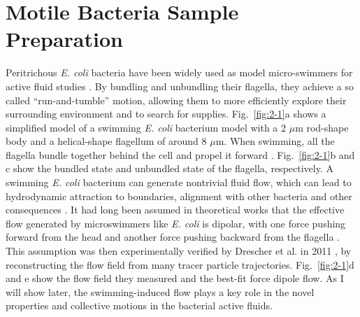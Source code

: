 \section{Motile Bacteria Sample Preparation}
\label{motile-bacteria-sample-preparation}
Peritrichous \textit{E. coli} bacteria have been widely used as model micro-swimmers for active fluid studies \cite{Poon2012, Schwarz-Linek2016}. By bundling and unbundling their flagella, they achieve a so called ``run-and-tumble'' motion, allowing them to more efficiently explore their surrounding environment and to search for supplies. Fig.~\ref{fig:2-1}a shows a simplified model of a swimming \textit{E. coli} bacterium model with a 2 $\mu$m rod-shape body and a helical-shape flagellum of around 8 $\mu$m. When swimming, all the flagella bundle together behind the cell and propel it forward \cite{Lauga2016}. Fig.~\ref{fig:2-1}b and c show the bundled state and unbundled state of the flagella, respectively. A swimming \textit{E. coli} bacterium can generate nontrivial fluid flow, which can lead to hydrodynamic attraction to boundaries, alignment with other bacteria and other consequences \cite{Elgeti2015}. It had long been assumed in theoretical works that the effective flow generated by microswimmers like \textit{E. coli} is dipolar, with one force pushing forward from the head and another force pushing backward from the flagella \cite{Simha2002, Ishikawa2007, Saintillan2008a, Saintillan2008b}. This assumption was then experimentally verified by Drescher et al. in 2011 \cite{Drescher2011}, by reconstructing the flow field from many tracer particle trajectories. Fig.~\ref{fig:2-1}d and e show the flow field they measured and the best-fit force dipole flow. As I will show later, the swimming-induced flow plays a key role in the novel properties and collective motions in the bacterial active fluids.

